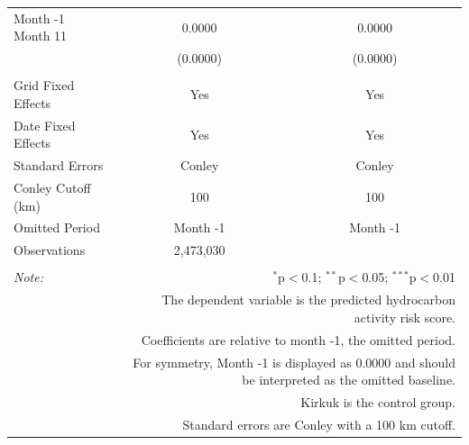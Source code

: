 \begin{table}[!htbp]
\begin{tabular}{@{\extracolsep{5pt}}lcc}
  Month -1  \hfill  Month 11 & 0.0000 & 0.0000 \\ 
  & (0.0000) & (0.0000) \\ 
 \hline \\[-1.8ex] 
Grid Fixed Effects & Yes & Yes \\ 
Date Fixed Effects & Yes & Yes \\ 
Standard Errors & Conley & Conley \\ 
Conley Cutoff (km) & 100 & 100 \\ 
Omitted Period & Month -1 & Month -1 \\ 
Observations & 2,473,030 &  \\ 
\hline 
\hline \\[-1.8ex] 
\textit{Note:}  & \multicolumn{2}{r}{$^{*}$p$<$0.1; $^{**}$p$<$0.05; $^{***}$p$<$0.01} \\ 
 & \multicolumn{2}{r}{The dependent variable is the predicted hydrocarbon activity risk score.} \\ 
 & \multicolumn{2}{r}{Coefficients are relative to month -1, the omitted period.} \\ 
 & \multicolumn{2}{r}{For symmetry, Month -1 is displayed as 0.0000 and should be interpreted as the omitted baseline.} \\ 
 & \multicolumn{2}{r}{Kirkuk is the control group.} \\ 
 & \multicolumn{2}{r}{Standard errors are Conley with a 100 km cutoff.} \\ 
\end{tabular} 
\end{table} 
